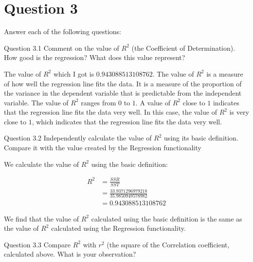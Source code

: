 \section*{Question 3}

{{Answer each of the following questions:}}

\vspace{10mm}

\begin{custombox}[label={box:Q3.1}]{Question 3.1}
	Comment on the value of $R^2$ (the Coefficient of Determination). How good is the regression? What does this value represent?
\end{custombox}

The value of $R^2$ which I got is $0.943088513108762$. The value of $R^2$ is a measure of how well the regression line fits the data. It is a measure of the proportion of the variance in the dependent variable that is predictable from the independent variable. The value of $R^2$ ranges from $0$ to $1$. A value of $R^2$ close to $1$ indicates that the regression line fits the data very well. In this case, the value of $R^2$ is very close to $1$, which indicates that the regression line fits the data very well. 

\vspace{10mm}

\begin{custombox}[label={box:Q3.2}]{Question 3.2}
	Independently calculate the value of $R^2$ using its basic definition. Compare it with the value created by the Regression functionality
\end{custombox}

We calculate the value of $R^2$ using the basic definition:

\begin{align*}
	R^2 &= \frac{SSR}{SST} \\
	&= \frac{33.9371296979218}{35.9850949578982} \\
	&= 0.943088513108762
\end{align*}

We find that the value of $R^2$ calculated using the basic definition is the same as the value of $R^2$ calculated using the Regression functionality.

\vspace{10mm}

\begin{custombox}[label={box:Q3.3}]{Question 3.3}
	Compare $R^2$ with $r^2$ (the square of the Correlation coefficient, calculated above. What is your observation?
\end{custombox}

